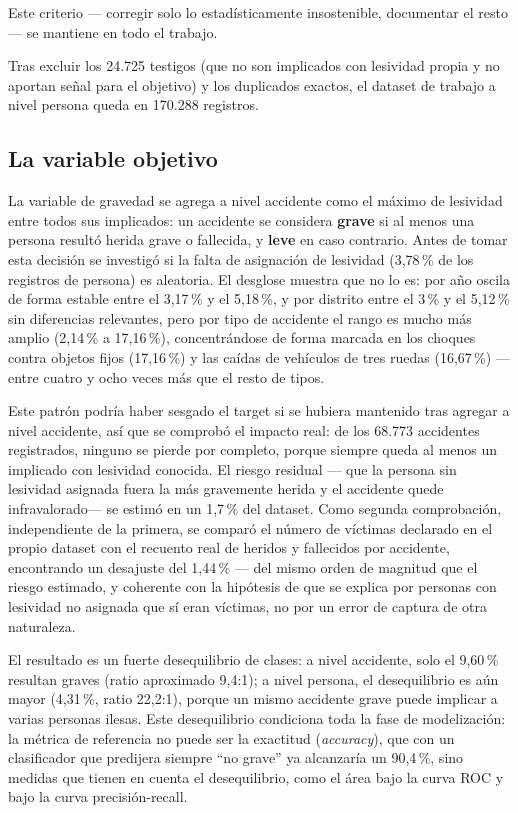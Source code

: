 \documentclass[11pt,a4paper]{article}
\begin{document}
Este criterio --- corregir solo lo estadísticamente insostenible, documentar el resto--- se mantiene en todo el trabajo.

Tras excluir los 24.725 testigos (que no son implicados con lesividad propia y no aportan señal para el objetivo) y los duplicados exactos, el dataset de trabajo a nivel persona queda en 170.288 registros.

\subsection{La variable objetivo}

La variable de gravedad se agrega a nivel accidente como el máximo de lesividad entre todos sus implicados: un accidente se considera \textbf{grave} si al menos una persona resultó herida grave o fallecida, y \textbf{leve} en caso contrario. 
Antes de tomar esta decisión se investigó si la falta de asignación de lesividad (3,78\,\% de los registros de persona) es aleatoria. El desglose muestra que no lo es: por año oscila de forma estable entre el 3,17\,\% y el 5,18\,\%, y por distrito entre el 3\,\% y el 5,12\,\% sin diferencias relevantes, pero por tipo de accidente el rango es mucho más amplio (2,14\,\% a 17,16\,\%), concentrándose de forma marcada en los choques contra objetos fijos (17,16\,\%) y las caídas de vehículos de tres ruedas (16,67\,\%) --- entre cuatro y ocho veces más que el resto de tipos.

Este patrón podría haber sesgado el target si se hubiera mantenido tras agregar a nivel accidente, así que se comprobó el impacto real: de los 68.773 accidentes registrados, ninguno se pierde por completo, porque siempre queda al menos un implicado con lesividad conocida. El riesgo residual --- que la persona sin lesividad asignada fuera la más gravemente herida y el accidente quede infravalorado--- se estimó en un 1,7\,\% del dataset. Como segunda comprobación, independiente de la primera, se comparó el número de víctimas declarado en el propio dataset con el recuento real de heridos y fallecidos por accidente, encontrando un desajuste del 1,44\,\% --- del mismo orden de magnitud que el riesgo estimado, y coherente con la hipótesis de que se explica por personas con lesividad no asignada que sí eran víctimas, no por un error de captura de otra naturaleza.

El resultado es un fuerte desequilibrio de clases: a nivel accidente, solo el 9,60\,\% resultan graves (ratio aproximado 9,4:1); a nivel persona, el desequilibrio es aún mayor (4,31\,\%, ratio 22,2:1), porque un mismo accidente grave puede implicar a varias personas ilesas. Este desequilibrio condiciona toda la fase de modelización: la métrica de referencia no puede ser la exactitud (\emph{accuracy}), que con un clasificador que predijera siempre ``no grave'' ya alcanzaría un 90,4\,\%, sino medidas que tienen en cuenta el desequilibrio, como el área bajo la curva ROC y bajo la curva precisión-recall.
\end{document}
